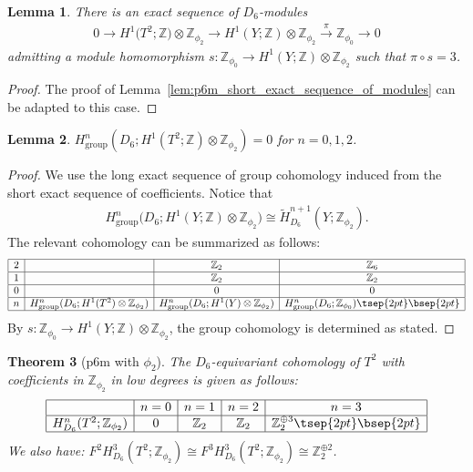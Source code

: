 \documentclass[pdftex]{sigma}
\newtheorem{thm}{Theorem}[section]
\newtheorem{lem}[thm]{Lemma}
\theoremstyle{definition}
\newcommand{\Z}{\mathbb{Z}}
\begin{document}
\begin{lem}
There is an exact sequence of $D_6$-modules
\begin{gather*}
0 \to H^1\big(T^2; \Z\big) \otimes \Z_{\phi_2} \to H^1(Y; \Z) \otimes \Z_{\phi_2} \overset{\pi}{\to}\Z_{\phi_0} \to 0
\end{gather*}
admitting a module homomorphism $s \colon \Z_{\phi_0} \to H^1(Y; \Z) \otimes \Z_{\phi_2}$ such that $\pi \circ s = 3$.
\end{lem}

\begin{proof}
The proof of Lemma~\ref{lem:p6m_short_exact_sequence_of_modules} can be adapted to this case.
\end{proof}

\begin{lem}
$H^n_{\mathrm{group}}(D_6; H^1(T^2; \Z) \otimes \Z_{\phi_2}) = 0$ for $n = 0, 1, 2$.
\end{lem}

\begin{proof}
We use the long exact sequence of group cohomology induced from the short exact sequence of coef\/f\/icients. Notice that
\begin{gather*}
H^n_{\mathrm{group}}\big(D_6; H^1(Y; \Z) \otimes \Z_{\phi_2}\big) \cong \tilde{H}^{n+1}_{D_6}(Y; \Z_{\phi_2}).
\end{gather*}
The relevant cohomology can be summarized as follows:
$$
\begin{array}{|c|c|c|c|}
\hline
2 & & \Z_2 & \Z_6 \\
\hline
1 & & \Z_2 & \Z_2 \\
\hline
0 & & 0 & 0 \\
\hline
n & H^n_{\mathrm{group}}(D_6; H^1(T^2) \otimes \Z_{\phi_2}) &
H^n_{\mathrm{group}}(D_6; H^1(Y) \otimes \Z_{\phi_2}) &
H^n_{\mathrm{group}}(D_6; \Z_{\phi_0})\tsep{2pt}\bsep{2pt}\\
\hline
\end{array}
$$
By $s \colon \Z_{\phi_0} \to H^1(Y; \Z) \otimes \Z_{\phi_2}$, the group cohomology is determined as stated.
\end{proof}

\begin{thm}[\textsf{p6m} with $\phi_2$]
The $D_6$-equivariant cohomology of $T^2$ with coefficients in $\Z_{\phi_2}$ in low degrees is given as follows:
$$
\begin{array}{|c|c|c|c|c|}
\hline
& n = 0 & n = 1 & n = 2 & n = 3 \\
\hline
H^n_{D_6}(T^2; \Z_{\phi_2}) & 0 & \Z_2 & \Z_2 & \Z_2^{\oplus 3} \tsep{2pt}\bsep{2pt}\\
\hline
\end{array}
$$
We also have: $F^2H^3_{D_6}(T^2; \Z_{\phi_2}) \cong F^3H^3_{D_6}(T^2; \Z_{\phi_2}) \cong \Z_2^{\oplus 2}$.
\end{thm}
\end{document}

